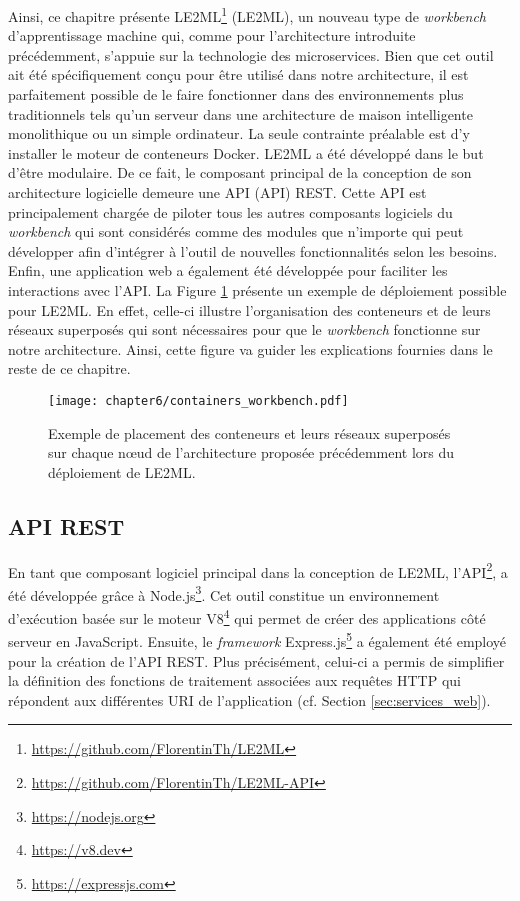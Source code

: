 Ainsi, ce chapitre présente \acs{LE2ML}\footnote{\url{https://github.com/FlorentinTh/LE2ML}} (\acl{LE2ML}), un nouveau type de \textit{workbench} d'apprentissage machine qui, comme pour l'architecture introduite précédemment, s'appuie sur la technologie des microservices. Bien que cet outil ait été spécifiquement conçu pour être utilisé dans notre architecture, il est parfaitement possible de le faire fonctionner dans des environnements plus traditionnels tels qu'un serveur dans une architecture de maison intelligente monolithique ou un simple ordinateur. La seule contrainte préalable est d'y installer le moteur de conteneurs Docker. LE2ML a été développé dans le but d'être modulaire. De ce fait, le composant principal de la conception de son architecture logicielle demeure une \acs{API} (\acl{API}) \acs{REST}. Cette API est principalement chargée de piloter tous les autres composants logiciels du \textit{workbench} qui sont considérés comme des modules que n'importe qui peut développer afin d'intégrer à l'outil de nouvelles fonctionnalités selon les besoins. Enfin, une application web a également été développée pour faciliter les interactions avec l'\acs{API}. La Figure \ref{fig:containers_workbench} présente un exemple de déploiement possible pour \acs{LE2ML}. En effet, celle-ci illustre l'organisation des conteneurs et de leurs réseaux superposés qui sont nécessaires pour que le \textit{workbench} fonctionne sur notre architecture. Ainsi, cette figure va guider les explications fournies dans le reste de ce chapitre.

\begin{figure}[H]
	\centering
	\texttt{[image: chapter6/containers\_workbench.pdf]}
        \caption{Exemple de placement des conteneurs et leurs réseaux superposés sur chaque n\oe{}ud de l'architecture proposée précédemment lors du déploiement de \acs{LE2ML}.}
	\label{fig:containers_workbench}
\end{figure}

\subsection{\acs{API} \acs{REST}}

En tant que composant logiciel principal dans la conception de \acs{LE2ML}, l'\acs{API}\footnote{\url{https://github.com/FlorentinTh/LE2ML-API}}, a été développée grâce à Node.js\footnote{\url{https://nodejs.org}}. Cet outil constitue un environnement d'exécution basée sur le moteur V8\footnote{\url{https://v8.dev}} qui permet de créer des applications côté serveur en JavaScript. Ensuite, le \textit{framework} Express.js\footnote{\url{https://expressjs.com}} a également été employé pour la création de l'\acs{API} \acs{REST}. Plus précisément, celui-ci a permis de simplifier la définition des fonctions de traitement associées aux requêtes \acs{HTTP} qui répondent aux différentes \acs{URI} de l'application (cf. Section \ref{sec:services_web}).


